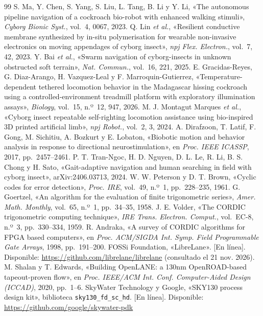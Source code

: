 \begin{thebibliography}{99}
 S. Ma, Y. Chen, S. Yang, S. Liu, L. Tang, B. Li y Y. Li, «The autonomous pipeline navigation of a cockroach bio-robot with enhanced walking stimuli», \textit{Cyborg Bionic Syst.}, vol.~4, 0067, 2023.
 Q. Lin \textit{et al.}, «Resilient conductive membrane synthesized by in-situ polymerisation for wearable non-invasive electronics on moving appendages of cyborg insect», \textit{npj Flex. Electron.}, vol.~7, 42, 2023.
 Y. Bai \textit{et al.}, «Swarm navigation of cyborg-insects in unknown obstructed soft terrain», \textit{Nat. Commun.}, vol.~16, 221, 2025.
 E. Gracidas-Reyes, G. Diaz-Arango, H. Vazquez-Leal y F. Marroquin-Gutierrez, «Temperature-dependent tethered locomotion behavior in the Madagascar hissing cockroach using a controlled-environment treadmill platform with exploratory illumination assays», \textit{Biology}, vol.~15, n.º~12, 947, 2026.
 M. J. Montagut Marques \textit{et al.}, «Cyborg insect repeatable self-righting locomotion assistance using bio-inspired 3D printed artificial limb», \textit{npj Robot.}, vol.~2, 3, 2024.
 A. Dirafzoon, T. Latif, F. Gong, M. Sichitiu, A. Bozkurt y E. Lobaton, «Biobotic motion and behavior analysis in response to directional neurostimulation», en \textit{Proc. IEEE ICASSP}, 2017, pp.~2457--2461.
 P. T. Tran-Ngoc, H. D. Nguyen, D. L. Le, R. Li, B. S. Chong y H. Sato, «Gait-adaptive navigation and human searching in field with cyborg insect», arXiv:2406.03713, 2024.
 W. W. Peterson y D. T. Brown, «Cyclic codes for error detection», \textit{Proc. IRE}, vol.~49, n.º~1, pp.~228--235, 1961.
 G. Goertzel, «An algorithm for the evaluation of finite trigonometric series», \textit{Amer. Math. Monthly}, vol.~65, n.º~1, pp.~34--35, 1958.
 J. E. Volder, «The CORDIC trigonometric computing technique», \textit{IRE Trans. Electron. Comput.}, vol.~EC-8, n.º~3, pp.~330--334, 1959.
 R. Andraka, «A survey of CORDIC algorithms for FPGA based computers», en \textit{Proc. ACM/SIGDA Int. Symp. Field Programmable Gate Arrays}, 1998, pp.~191--200.
 FOSSi Foundation, «LibreLane». [En línea]. Disponible: \url{https://github.com/librelane/librelane} (consultado el 21 nov. 2026).
 M. Shalan y T. Edwards, «Building OpenLANE: a 130nm OpenROAD-based tapeout-proven flow», en \textit{Proc. IEEE/ACM Int. Conf. Computer-Aided Design (ICCAD)}, 2020, pp.~1--6.
 SkyWater Technology y Google, «SKY130 process design kit», biblioteca \texttt{sky130\_fd\_sc\_hd}. [En línea]. Disponible: \url{https://github.com/google/skywater-pdk}

\end{thebibliography}

